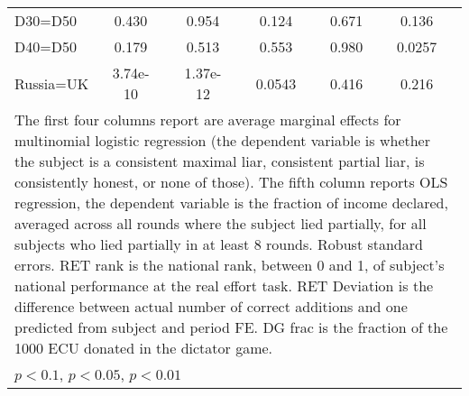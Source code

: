 \begin{tabular}{l|cccccccc|cc}
D30=D50         &    0.430         &         &    0.954         &         &    0.124         &         &    0.671         &         &    0.136         &         \\
D40=D50         &    0.179         &         &    0.513         &         &    0.553         &         &    0.980         &         &   0.0257         &         \\
Russia=UK       & 3.74e-10         &         & 1.37e-12         &         &   0.0543         &         &    0.416         &         &    0.216         &         \\
\hline\hline
\multicolumn{11}{p{16.5cm}}{\tiny The first four columns report are average marginal effects for multinomial logistic regression (the dependent variable is whether the subject is a consistent maximal liar, consistent partial liar, is consistently honest, or none of those). The fifth column reports OLS regression, the dependent variable is the fraction of income declared, averaged across all rounds where the subject lied partially, for all subjects who lied partially in at least 8 rounds. Robust standard errors. RET rank is the national rank, between 0 and 1, of subject's national performance at the real effort task. RET Deviation is the difference between actual number of correct additions and one predicted from subject and period FE. DG frac is the fraction of the 1000 ECU donated in the dictator game.}\\
\multicolumn{11}{l}{\tiny \sym{*} \(p<0.1\), \sym{**} \(p<0.05\), \sym{***} \(p<0.01\)}\\
\end{tabular}